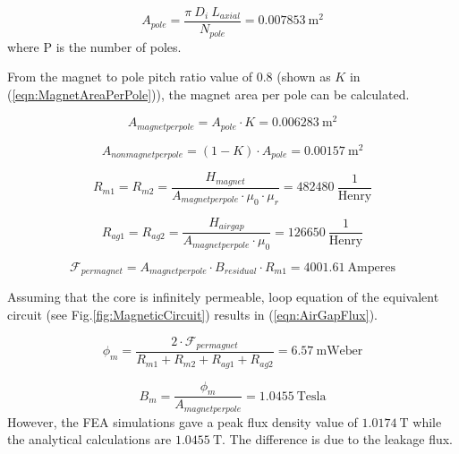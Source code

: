 \documentclass{article}
\begin{document}
\begin{equation} \label{eqn:PoleAreaFormula}
    A_{pole} = \frac{\pi \: D_i \: L_{axial}}{N_{pole}}=0.007853 \: \mathrm{m^2}
\end{equation}
where P is the number of poles.

\bigskip


\noindent From the magnet to pole pitch ratio value of 0.8 (shown as $K$ in (\ref{eqn:MagnetAreaPerPole})), the magnet area per pole can be calculated. 
\bigskip

\begin{equation} \label{eqn:MagnetAreaPerPole}
    A_{magnetperpole} = A_{pole}\cdot K = 0.006283 \: \mathrm{m^2}
\end{equation}

\begin{equation} \label{eqn:NonMagnetAreaPerPole}
    A_{nonmagnetperpole} = (1-K) \cdot A_{pole} = 0.00157 \: \mathrm{m^2}
\end{equation}

\begin{equation} \label{eqn:MagnetReluctance}
    R_{m1}  =  R_{m2} =  \frac{H_{magnet}}{A_{magnetperpole} \cdot \mu_0 \cdot \mu_r}  = 482480 \: \mathrm{\frac{1}{Henry}} 
\end{equation}

\begin{equation} \label{eqn:AirGapReluctance}
    R_{ag1}  =  R_{ag2} =  \frac{H_{airgap}}{A_{magnetperpole} \cdot \mu_0}  =  126650  \: \mathrm{\frac{1}{Henry}} 
\end{equation}

\begin{equation} \label{eqn:MmfPerMagnet}
    \mathcal{F}_{permagnet} = A_{magnetperpole} \cdot B_{residual} \cdot R_{m1} = 4001.61 \: \mathrm{Amperes}
\end{equation}

\bigskip

\noindent Assuming that the core is infinitely permeable, loop equation of the equivalent circuit (see Fig.\ref{fig:MagneticCircuit}) results in (\ref{eqn:AirGapFlux}).
\bigskip

\begin{equation} \label{eqn:AirGapFlux}
    \phi_{m} = \frac{2 \cdot \mathcal{F}_{permagnet}}{R_{m1}+R_{m2}+R_{ag1}+R_{ag2}} = 6.57 \: \mathrm{mWeber}
\end{equation}

\begin{equation} \label{eqn:AirGapFluxDensity}
    B_{m} = \frac{\phi_{m}}{A_{magnetperpole}} = 1.0455 \: \mathrm{Tesla}
\end{equation}
However, the FEA simulations gave a peak flux density value of $1.0174\: \mathrm{T} $ while the analytical calculations are $ 1.0455  \: \mathrm{T}$. The difference is due to the leakage flux. 
\end{document}
